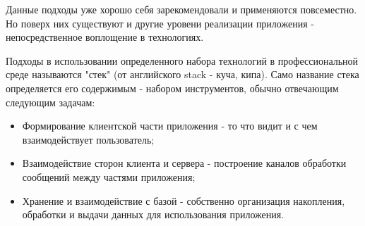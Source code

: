    Данные подходы уже хорошо себя зарекомендовали и применяются повсеместно.
    Но поверх них существуют и другие уровени реализации приложения - непосредственное воплощение в технологиях.

    Подходы в использовании определенного набора технологий в профессиональной среде называются "стек" (от английского stack - куча, кипа).
    Само название стека определяется его содержимым - набором инструментов, обычно отвечающим следующим задачам:
    \begin{itemize}
        \item Формирование клиентской части приложения - то что видит и с чем взаимодействует пользователь;
        \item Взаимодействие сторон клиента и сервера - построение каналов обработки сообщений между частями приложения;
        \item Хранение и взаимодействие с базой - собственно организация накопления, обработки и выдачи данных для использования приложения.
    \end{itemize}

